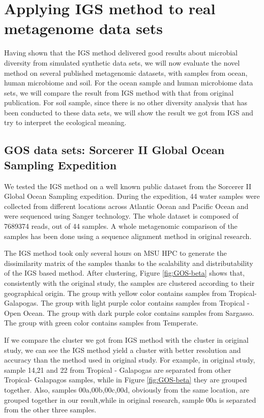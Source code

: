 \section{Applying IGS method to real metagenome data sets}

Having shown that the IGS method delivered good results about microbial diversity 
from simulated synthetic data sets, 
we will now evaluate the novel method on several published metagenomic 
datasets, with samples 
from ocean, human microbiome and soil. For the ocean sample and human microbiome 
data sets, we will compare the result from IGS method
with that from original publication. For soil sample, since there is no other 
diversity analysis that has been conducted
to these data sets, we will show the result we got from IGS and try to 
interpret the ecological meaning.


\subsection{GOS data sets: Sorcerer II Global Ocean Sampling Expedition}

We tested the IGS method on a well known public dataset from the Sorcerer II 
Global Ocean Sampling expedition.
During the expedition, 44 water samples were collected from different locations across
Atlantic Ocean and Pacific Ocean and were sequenced using Sanger technology. 
The whole dataset is composed of 7689374 reads, out of 44 samples.
A whole metagenomic comparison of the samples has been done
using a sequence alignment method in original research. 

The IGS method took only several hours on MSU HPC to generate the dissimilarity 
matrix of the samples thanks to the scalability and distributability of the IGS 
based method. After clustering, 
Figure \ref{fig:GOS-beta} shows that, consistently with the original study, 
the samples are clustered according to their 
geographical origin. The group with yellow color contains samples from 
Tropical- Galapogas. The group with light purple color
contains samples from Tropical -Open Ocean. The group with dark purple 
color contains samples from Sargasso. The group 
with green color contains samples from Temperate. 

If we compare the cluster we got from IGS method with the cluster in original 
study, we can see the IGS method yield a
cluster with better resolution and accuracy than the method used in original 
study. For example, in original study,
sample 14,21 and 22 from Tropical - Galapogas are separated from other 
Tropical- Galapagos samples, while in Figure \ref{fig:GOS-beta} 
they are grouped together. Also, samples 00a,00b,00c,00d, obviously from the 
same location, are grouped together in our result,while
in original research, sample 00a is separated from the other three samples.


